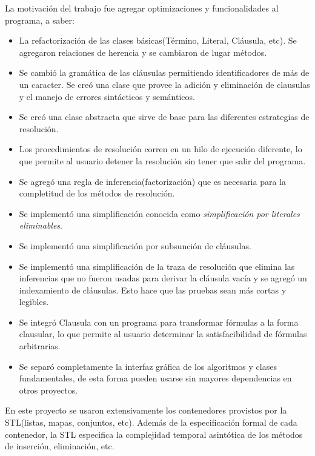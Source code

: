 \documentclass[a4paper,12pt]{article}
\begin{document}
La motivación del trabajo fue agregar optimizaciones y funcionalidades al programa,
a saber:
\begin{itemize}
\renewcommand{\labelitemi}{$\bullet$}
\item La refactorización de las clases básicas(Término, Literal, Cláusula, etc). Se agregaron relaciones
de herencia y se cambiaron de lugar métodos.
\item Se cambió la gramática de las cláusulas permitiendo identificadores de más de un caracter. Se creó una clase
que provee la adición y eliminación de clausulas y el manejo de errores sintácticos y semánticos.
\item Se creó una clase abstracta que sirve de base para las diferentes estrategias de resolución.
\item Los procedimientos de resolución corren en un hilo de ejecución diferente, lo que permite al usuario detener la resolución sin tener que
salir del programa.
\item Se agregó una regla de inferencia(factorización) que es necesaria para la completitud de los métodos de resolución.
\item Se implementó una simplificación conocida como \emph{simplificación por literales eliminables}.
\item Se implementó una simplificación por subsunción de cláusulas.
\item Se implementó una simplificación de la traza de resolución que elimina las inferencias que no fueron
usadas para derivar la cláusula vacía y se agregó un indexamiento de cláusulas. Esto hace que las pruebas sean
más cortas y legibles.
\item Se integró Clausula con un programa para transformar fórmulas a la forma clausular, lo que permite al usuario
determinar la satisfacibilidad de fórmulas arbitrarias.
\item Se separó completamente la interfaz gráfica de los algoritmos y clases fundamentales, de esta forma
pueden usarse sin mayores dependencias en otros proyectos.
\end{itemize}
En este proyecto se usaron extensivamente los contenedores provistos por la STL(listas, mapas, conjuntos, etc). Además
de la especificación formal de cada contenedor, la STL especifica la complejidad temporal asintótica de los métodos de
inserción, eliminación, etc.\cite{sgi}
\end{document}
